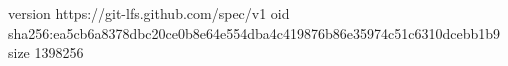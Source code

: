 version https://git-lfs.github.com/spec/v1
oid sha256:ea5cb6a8378dbc20ce0b8e64e554dba4c419876b86e35974c51c6310dcebb1b9
size 1398256
